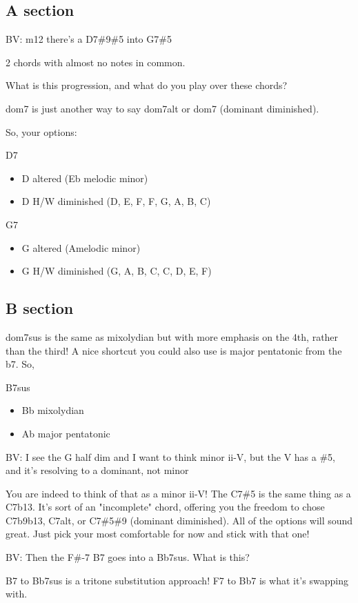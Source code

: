 \documentclass[11pt]{article}
\begin{document}
\subsection{A section}
\label{sec:org03a3561}

BV: m12 there’s a D7\#9\#5 into G7\#5

2 chords with almost no notes in common.

What is this progression, and what do you play over these chords?


dom7 is just another way to say dom7alt or dom7 (dominant diminished).

So, your options:

D7
\begin{itemize}
\item D altered (Eb melodic minor)
\item D H/W diminished (D, E\flat,  F, F\sharp,  G\sharp,  A, B, C)
\end{itemize}

G7
\begin{itemize}
\item G altered (A\flat   melodic minor)
\item G H/W diminished (G, A, B\flat, C, C\sharp, D\sharp, E, F\sharp)
\end{itemize}

\subsection{B section}
\label{sec:org7f2c1e2}

dom7sus is the same as mixolydian but with more emphasis on the 4th, rather than the third! A nice shortcut you could also use is major pentatonic from the b7. So,

B\flat 7sus
\begin{itemize}
\item Bb mixolydian
\item Ab major pentatonic
\end{itemize}

BV: I see the G half dim and I want to think minor ii-V, but the V has a \#5, and it’s resolving to a dominant, not minor

You are indeed to think of that as a minor ii-V! The C7\#5 is the same thing as a C7b13. It's sort of an "incomplete" chord, offering you the freedom to chose C7b9b13, C7alt, or C7\#5\#9 (dominant diminished). All of the options will sound great. Just pick your most comfortable for now and stick with that one!

BV: Then the F\#-7 B7 goes into a Bb7sus. What is this?

B7 to Bb7sus is a tritone substitution approach! F7 to Bb7 is what it's swapping with.
\end{document}
